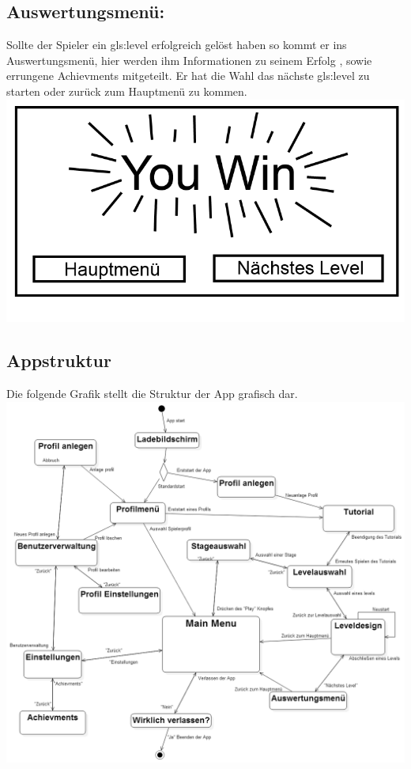 \documentclass{scrartcl}
\begin{document}
\begin{enumerate}
	\begin{minipage}{1\textwidth}
		\item \subsection*{Auswertungsmenü:}
		Sollte der Spieler ein \gls{gls:level} erfolgreich gelöst haben so kommt er ins Auswertungsmenü, hier werden ihm Informationen zu seinem Erfolg , sowie errungene Achievments mitgeteilt. Er hat die Wahl das nächste \gls{gls:level} zu starten oder zurück zum Hauptmenü zu kommen. 
		\includegraphics[scale=0.5]{assets/Auswertungsmenu}
	\end{minipage}

\end{enumerate}

\clearpage

\begin{minipage}{1\textwidth}
\subsection{Appstruktur}
	Die folgende Grafik stellt die Struktur der App grafisch dar.\\
	\includegraphics[width=\textwidth]{assets/Menustructur}
\end{minipage}
\end{document}
